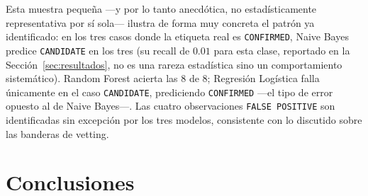 \documentclass[10pt,journal]{IEEEtran}
\begin{document}
  \begin{table}[H]
    \caption{Predicci\'on de los tres modelos sobre 8 KOI no vistos en entrenamiento (CONF.=\texttt{CONFIRMED}, CAND.=\texttt{CANDIDATE}, F.POS.=\texttt{FALSE POSITIVE})}
    \label{tab:inferencia}
    \centering
  \end{table}

  Esta muestra peque\~na —y por lo tanto anecd\'otica, no estad\'isticamente representativa por s\'i sola— ilustra de forma muy concreta el patr\'on ya identificado: en los tres casos donde la etiqueta real es \texttt{CONFIRMED}, Naive Bayes predice \texttt{CANDIDATE} en los tres (su recall de $0.01$ para esta clase, reportado en la Secci\'on~\ref{sec:resultados}, no es una rareza estad\'istica sino un comportamiento sistem\'atico). Random Forest acierta las 8 de 8; Regresi\'on Log\'istica falla \'unicamente en el caso \texttt{CANDIDATE}, prediciendo \texttt{CONFIRMED} —el tipo de error opuesto al de Naive Bayes—. Las cuatro observaciones \texttt{FALSE POSITIVE} son identificadas sin excepci\'on por los tres modelos, consistente con lo discutido sobre las banderas de vetting.

  \FloatBarrier

  \section{Conclusiones}
\end{document}

